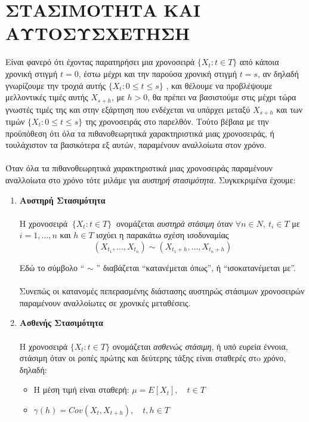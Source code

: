 \section{ ΣΤΑΣΙΜΟΤΗΤΑ ΚΑΙ ΑΥΤΟΣΥΣΧΕΤΗΣΗ}

Είναι φανερό ότι έχοντας παρατηρήσει μια χρονοσειρά
$ \{ X_t : t \in T \} $
από κάποια
χρονική στιγμή $ t = 0 $, έστω μέχρι και την παρούσα χρονική στιγμή $ t = s $, αν δηλαδή
γνωρίζουμε την τροχιά αυτής $ \{ X_t : 0 \leq t \leq s \}$ , και θέλουμε να προβλέψουμε
μελλοντικές τιμές αυτής $ X_{s + h} $, με $ h > 0 $, θα πρέπει να βασιστούμε στις μέχρι τώρα
γνωστές τιμές της και στην εξάρτηση που ενδέχεται να υπάρχει μεταξύ $ X_{s + h} $ και
των τιμών
$ \{ X_t : 0 \leq t \leq s \}$
της χρονοσειράς στο παρελθόν. Τούτο βέβαια με την
προϋπόθεση ότι όλα τα πιθανοθεωρητικά χαρακτηριστικά μιας χρονοσειράς, ή
τουλάχιστον τα βασικότερα εξ αυτών, παραμένουν αναλλοίωτα στον χρόνο. \\ \\
Όταν όλα τα πιθανοθεωρητικά χαρακτηριστικά μιας χρονοσειράς παραμένουν
αναλλοίωτα στο χρόνο τότε μιλάμε για \textit{αυστηρή στασιμότητα}. Συγκεκριμένα έχουμε:
\begin{enumerate}
\item \textbf{ Αυστηρή Στασιμότητα} \\\\
Η χρονοσειρά $\: \{ X_t: t \in T \} \: $ ονομάζεται
\textit{αυστηρά στάσιμη} όταν $ \forall n \in N,\:  t_i \in T $ με $ i=1,\ldots ,n $  και  $ h \in T $
ισχύει η παρακάτω
σχέση ισοδυναμίας \\
$$ \left( X_{t_1}, \ldots , X_{t_n} \right)  \sim \left( X_{t_1+h}, \ldots , X_{t_n+h}    \right) $$


Εδώ το σύμβολο “ $\sim$ ” διαβάζεται “κατανέμεται όπως”, ή “ισοκατανέμεται με”. \\\\
Συνεπώς οι κατανομές πεπερασμένης διάστασης αυστηρώς στάσιμων
χρονοσειρών παραμένουν αναλλοίωτες σε χρονικές μεταθέσεις. 

\item \textbf{ Ασθενής Στασιμότητα} \\\\
Η χρονοσειρά
$ \{ X_t : t \in T \}$
ονομάζεται
\textit{ασθενώς στάσιμη}, ή υπό ευρεία έννοια, στάσιμη όταν οι ροπές πρώτης και δεύτερης τάξης είναι σταθερές στo
χρόνο, δηλαδή: \\
\begin{itemize}
\item Η μέση τιμή είναι σταθερή: $  \mu = E \left[ X_t \right] ,\quad t \in T $
\item $ \gamma(h)=Cov(X_t,X_{t+h}), \quad t,h \in T $
\end{itemize}
 
\end{enumerate}

